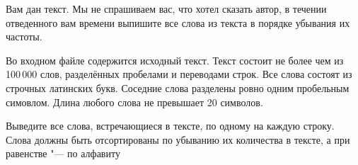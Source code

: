﻿%

Вам дан текст. Мы не спрашиваем вас, что хотел сказать автор, в течении отведенного вам времени выпишите все слова из текста в порядке убывания их частоты.

\InputFile

Во входном файле содержится исходный текст. Текст состоит не более чем из 100\,000 слов, разделённых пробелами и переводами строк. Все слова состоят из строчных латинских букв.
Соседние слова разделены ровно одним пробельным симовлом. Длина любого слова не превышает 20 символов.

\OutputFile

Выведите все слова, встречающиеся в тексте, по одному на каждую строку. Слова должны быть отсортированы по убыванию их количества в тексте, а при равенстве "--- по алфавиту